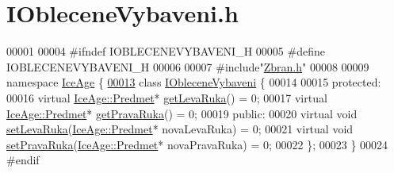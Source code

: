 \hypertarget{IObleceneVybaveni_8h_source}{}\section{I\+Oblecene\+Vybaveni.\+h}
\label{IObleceneVybaveni_8h_source}

\begin{DoxyCode}
00001 
00004 \textcolor{preprocessor}{#ifndef IOBLECENEVYBAVENI\_H}
00005 \textcolor{preprocessor}{#define IOBLECENEVYBAVENI\_H}
00006 
00007 \textcolor{preprocessor}{#include"\hyperlink{Zbran_8h}{Zbran.h}"}
00008 
00009 \textcolor{keyword}{namespace }\hyperlink{namespaceIceAge}{IceAge} \{
\hypertarget{IObleceneVybaveni_8h_source.tex_l00013}{}\hyperlink{classIceAge_1_1IObleceneVybaveni}{00013}     \textcolor{keyword}{class }\hyperlink{classIceAge_1_1IObleceneVybaveni}{IObleceneVybaveni} \{
00014 
00015     \textcolor{keyword}{protected}:
00016         \textcolor{keyword}{virtual} \hyperlink{classIceAge_1_1Predmet}{IceAge::Predmet}* \hyperlink{classIceAge_1_1IObleceneVybaveni_aef419594396938b2d819dd6968ac56fc}{getLevaRuka}() = 0;
00017         \textcolor{keyword}{virtual} \hyperlink{classIceAge_1_1Predmet}{IceAge::Predmet}* \hyperlink{classIceAge_1_1IObleceneVybaveni_aa0edf7411a319b56d4e1ac361797b3c4}{getPravaRuka}() = 0;
00019     \textcolor{keyword}{public}:
00020         \textcolor{keyword}{virtual} \textcolor{keywordtype}{void} \hyperlink{classIceAge_1_1IObleceneVybaveni_a7200f6920521037a3d432b6f5f3b0ae0}{setLevaRuka}(\hyperlink{classIceAge_1_1Predmet}{IceAge::Predmet}* novaLevaRuka) = 0;
00021         \textcolor{keyword}{virtual} \textcolor{keywordtype}{void} \hyperlink{classIceAge_1_1IObleceneVybaveni_a50ee586bd1661e0da4e1bebdb667db21}{setPravaRuka}(\hyperlink{classIceAge_1_1Predmet}{IceAge::Predmet}* novaPravaRuka) = 0;
00022     \};
00023 \}
00024 \textcolor{preprocessor}{#endif}
\end{DoxyCode}
